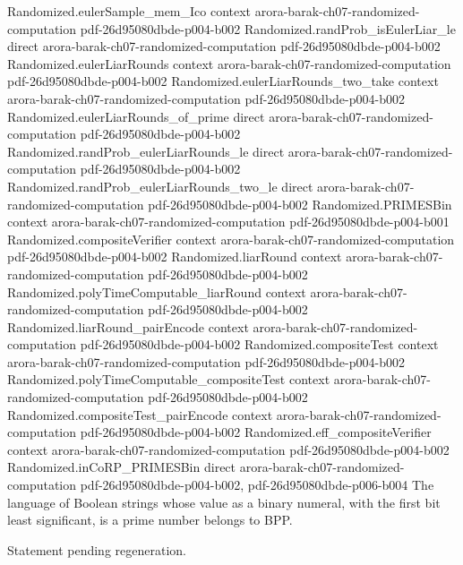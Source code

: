 \begin{theorem}
\proofstep
  {Randomized.eulerSample_mem_Ico}
  {context}
  {arora-barak-ch07-randomized-computation}
  {pdf-26d95080dbde-p004-b002}
\proofstep
  {Randomized.randProb_isEulerLiar_le}
  {direct}
  {arora-barak-ch07-randomized-computation}
  {pdf-26d95080dbde-p004-b002}
\proofstep
  {Randomized.eulerLiarRounds}
  {context}
  {arora-barak-ch07-randomized-computation}
  {pdf-26d95080dbde-p004-b002}
\proofstep
  {Randomized.eulerLiarRounds_two_take}
  {context}
  {arora-barak-ch07-randomized-computation}
  {pdf-26d95080dbde-p004-b002}
\proofstep
  {Randomized.eulerLiarRounds_of_prime}
  {direct}
  {arora-barak-ch07-randomized-computation}
  {pdf-26d95080dbde-p004-b002}
\proofstep
  {Randomized.randProb_eulerLiarRounds_le}
  {direct}
  {arora-barak-ch07-randomized-computation}
  {pdf-26d95080dbde-p004-b002}
\proofstep
  {Randomized.randProb_eulerLiarRounds_two_le}
  {direct}
  {arora-barak-ch07-randomized-computation}
  {pdf-26d95080dbde-p004-b002}
\proofstep
  {Randomized.PRIMESBin}
  {context}
  {arora-barak-ch07-randomized-computation}
  {pdf-26d95080dbde-p004-b001}
\proofstep
  {Randomized.compositeVerifier}
  {context}
  {arora-barak-ch07-randomized-computation}
  {pdf-26d95080dbde-p004-b002}
\proofstep
  {Randomized.liarRound}
  {context}
  {arora-barak-ch07-randomized-computation}
  {pdf-26d95080dbde-p004-b002}
\proofstep
  {Randomized.polyTimeComputable_liarRound}
  {context}
  {arora-barak-ch07-randomized-computation}
  {pdf-26d95080dbde-p004-b002}
\proofstep
  {Randomized.liarRound_pairEncode}
  {context}
  {arora-barak-ch07-randomized-computation}
  {pdf-26d95080dbde-p004-b002}
\proofstep
  {Randomized.compositeTest}
  {context}
  {arora-barak-ch07-randomized-computation}
  {pdf-26d95080dbde-p004-b002}
\proofstep
  {Randomized.polyTimeComputable_compositeTest}
  {context}
  {arora-barak-ch07-randomized-computation}
  {pdf-26d95080dbde-p004-b002}
\proofstep
  {Randomized.compositeTest_pairEncode}
  {context}
  {arora-barak-ch07-randomized-computation}
  {pdf-26d95080dbde-p004-b002}
\proofstep
  {Randomized.eff_compositeVerifier}
  {context}
  {arora-barak-ch07-randomized-computation}
  {pdf-26d95080dbde-p004-b002}
\proofstep
  {Randomized.inCoRP_PRIMESBin}
  {direct}
  {arora-barak-ch07-randomized-computation}
  {pdf-26d95080dbde-p004-b002,
    pdf-26d95080dbde-p006-b004}
The language of Boolean strings whose value as a binary numeral, with the first bit
least significant, is a prime number belongs to BPP.
\end{theorem}

\begin{theorem}
\label{Randomized.PRIMESBin_mem_coRP_PTM}
\leanok
{}
Statement pending regeneration.
\end{theorem}

